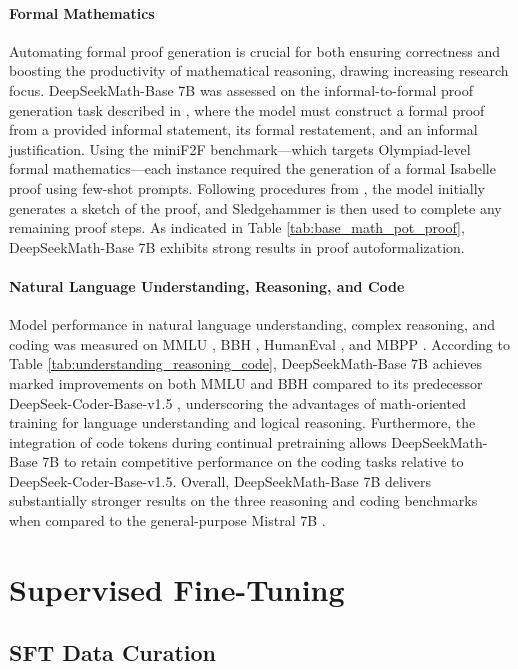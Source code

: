 \paragraph{Formal Mathematics}

Automating formal proof generation is crucial for both ensuring correctness and boosting the productivity of mathematical reasoning, drawing increasing research focus. DeepSeekMath-Base 7B was assessed on the informal-to-formal proof generation task described in \citep{dsp_proof}, where the model must construct a formal proof from a provided informal statement, its formal restatement, and an informal justification. Using the miniF2F \citep{minif2f} benchmark—which targets Olympiad-level formal mathematics—each instance required the generation of a formal Isabelle proof using few-shot prompts. Following procedures from \cite{dsp_proof}, the model initially generates a sketch of the proof, and Sledgehammer \citep{sledgehammer} is then used to complete any remaining proof steps. As indicated in Table \ref{tab:base_math_pot_proof}, DeepSeekMath-Base 7B exhibits strong results in proof autoformalization.

\paragraph{Natural Language Understanding, Reasoning, and Code}

Model performance in natural language understanding, complex reasoning, and coding was measured on MMLU \citep{mmlu}, BBH \citep{bbh}, HumanEval \citep{codex}, and MBPP \citep{mbpp}. According to Table \ref{tab:understanding_reasoning_code}, DeepSeekMath-Base 7B achieves marked improvements on both MMLU and BBH compared to its predecessor DeepSeek-Coder-Base-v1.5 \citep{deepseek-coder}, underscoring the advantages of math-oriented training for language understanding and logical reasoning. Furthermore, the integration of code tokens during continual pretraining allows DeepSeekMath-Base 7B to retain competitive performance on the coding tasks relative to DeepSeek-Coder-Base-v1.5. Overall, DeepSeekMath-Base 7B delivers substantially stronger results on the three reasoning and coding benchmarks when compared to the general-purpose Mistral 7B \citep{mistral}.

\section{Supervised Fine-Tuning}

\subsection{SFT Data Curation}

